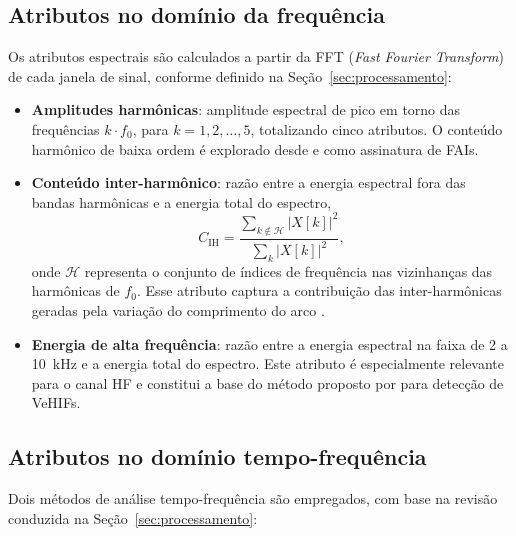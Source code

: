 \subsection{Atributos no domínio da frequência}

Os atributos espectrais são calculados a partir da FFT (\textit{Fast Fourier Transform}) de cada janela de sinal, conforme definido na Seção~\ref{sec:processamento}:

\begin{itemize}
    \item \textbf{Amplitudes harmônicas}: amplitude espectral de pico em torno das frequências $k \cdot f_0$, para $k = 1, 2, \ldots, 5$, totalizando cinco atributos. O conteúdo harmônico de baixa ordem é explorado desde  e  como assinatura de FAIs.

    \item \textbf{Conteúdo inter-harmônico}: razão entre a energia espectral fora das bandas harmônicas e a energia total do espectro,
    \begin{equation}
        C_{\mathrm{IH}} = \frac{\sum_{k \notin \mathcal{H}} |X[k]|^2}{\sum_{k} |X[k]|^2},
        \label{eq:interharmonic}
    \end{equation}
    onde $\mathcal{H}$ representa o conjunto de índices de frequência nas vizinhanças das harmônicas de $f_0$. Esse atributo captura a contribuição das inter-harmônicas geradas pela variação do comprimento do arco \cite{Macedo2015}.

    \item \textbf{Energia de alta frequência}: razão entre a energia espectral na faixa de 2 a 10~kHz e a energia total do espectro. Este atributo é especialmente relevante para o canal HF e constitui a base do método proposto por  para detecção de VeHIFs.
\end{itemize}

\subsection{Atributos no domínio tempo-frequência}

Dois métodos de análise tempo-frequência são empregados, com base na revisão conduzida na Seção~\ref{sec:processamento}:

